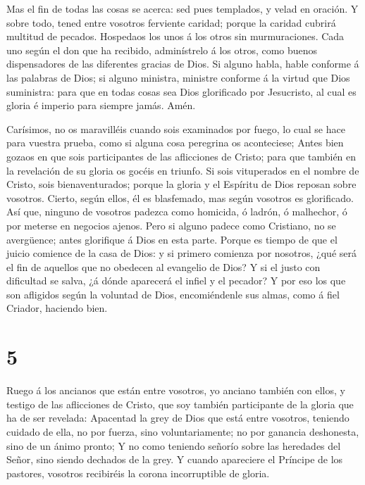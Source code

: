  Mas el fin de todas las cosas se acerca: sed pues
templados, y velad en oración.  Y sobre todo, tened entre
vosotros ferviente caridad; porque la caridad cubrirá multitud de
pecados.  Hospedaos los unos á los otros sin murmuraciones.
 Cada uno según el don que ha recibido, adminístrelo á los
otros, como buenos dispensadores de las diferentes gracias de Dios.
 Si alguno habla, hable conforme á las palabras de Dios; si
alguno ministra, ministre conforme á la virtud que Dios suministra: para
que en todas cosas sea Dios glorificado por Jesucristo, al cual es
gloria é imperio para siempre jamás. Amén.

 Carísimos, no os maravilléis cuando sois examinados por
fuego, lo cual se hace para vuestra prueba, como si alguna cosa
peregrina os aconteciese;  Antes bien gozaos en que sois
participantes de las aflicciones de Cristo; para que también en la
revelación de su gloria os gocéis en triunfo.  Si sois
vituperados en el nombre de Cristo, sois bienaventurados; porque la
gloria y el Espíritu de Dios reposan sobre vosotros. Cierto, según
ellos, él es blasfemado, mas según vosotros es glorificado.
 Así que, ninguno de vosotros padezca como homicida, ó
ladrón, ó malhechor, ó por meterse en negocios ajenos. 
Pero si alguno padece como Cristiano, no se avergüence; antes glorifique
á Dios en esta parte.  Porque es tiempo de que el juicio
comience de la casa de Dios: y si primero comienza por nosotros, ¿qué
será el fin de aquellos que no obedecen al evangelio de Dios?
 Y si el justo con dificultad se salva, ¿á dónde aparecerá
el infiel y el pecador?  Y por eso los que son afligidos
según la voluntad de Dios, encomiéndenle sus almas, como á fiel Criador,
haciendo bien.

\hypertarget{section-4}{%
\section{5}\label{section-4}}

 Ruego á los ancianos que están entre vosotros, yo anciano
también con ellos, y testigo de las aflicciones de Cristo, que soy
también participante de la gloria que ha de ser revelada: 
Apacentad la grey de Dios que está entre vosotros, teniendo cuidado de
ella, no por fuerza, sino voluntariamente; no por ganancia deshonesta,
sino de un ánimo pronto;  Y no como teniendo señorío sobre
las heredades del Señor, sino siendo dechados de la grey.  Y
cuando apareciere el Príncipe de los pastores, vosotros recibiréis la
corona incorruptible de gloria.

